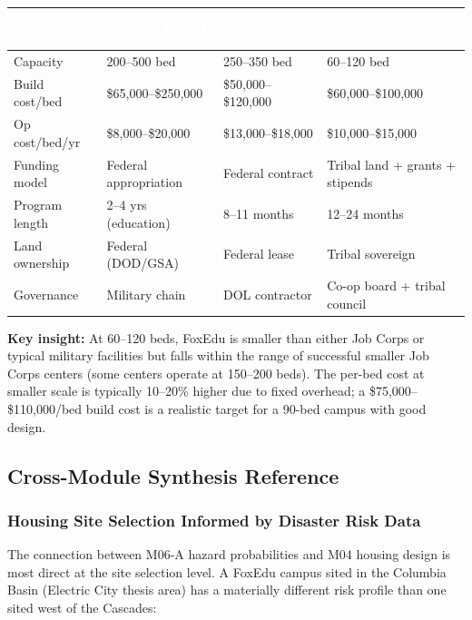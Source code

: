 \documentclass[11pt,letterpaper]{article}
\newcommand{\tableheader}[1]{\textbf{\sffamily\textcolor{white}{#1}}}
\begin{document}
\begin{center}
\begin{tabularx}{\textwidth}{L{2.8cm}L{3cm}L{3cm}X}
\toprule
{}
\tableheader{Parameter} & \tableheader{Military Model} & \tableheader{Job Corps Model} & \tableheader{FoxEdu Target} \\
\midrule
Capacity & 200--500 bed & 250--350 bed & 60--120 bed \\
Build cost/bed & \$65,000--\$250,000 & \$50,000--\$120,000 & \$60,000--\$100,000 \\
Op cost/bed/yr & \$8,000--\$20,000 & \$13,000--\$18,000 & \$10,000--\$15,000 \\
Funding model & Federal appropriation & Federal contract & Tribal land + grants + stipends \\
Program length & 2--4 yrs (education) & 8--11 months & 12--24 months \\
Land ownership & Federal (DOD/GSA) & Federal lease & Tribal sovereign \\
Governance & Military chain & DOL contractor & Co-op board + tribal council \\
\bottomrule
\end{tabularx}
\end{center}

\textbf{Key insight:} At 60--120 beds, FoxEdu is smaller than either Job Corps or typical military facilities but falls within the range of successful smaller Job Corps centers (some centers operate at 150--200 beds). The per-bed cost at smaller scale is typically 10--20\% higher due to fixed overhead; a \$75,000--\$110,000/bed build cost is a realistic target for a 90-bed campus with good design.

\subsection{Cross-Module Synthesis Reference}

\subsubsection{Housing Site Selection Informed by Disaster Risk Data}

The connection between M06-A hazard probabilities and M04 housing design is most direct at the site selection level. A FoxEdu campus sited in the Columbia Basin (Electric City thesis area) has a materially different risk profile than one sited west of the Cascades:
\end{document}
